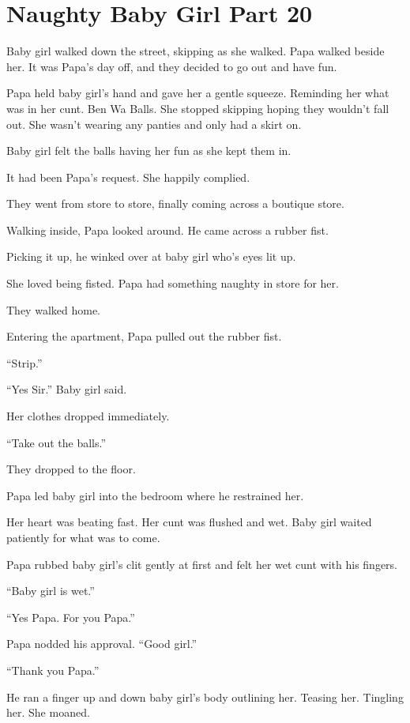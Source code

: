\section{Naughty Baby Girl Part 20}

    Baby girl walked down the street, skipping as she walked. Papa walked beside her. It was Papa’s day off, and they decided to go out and have fun.

    Papa held baby girl’s hand and gave her a gentle squeeze. Reminding her what was in her cunt. Ben Wa Balls. She stopped skipping hoping they wouldn’t fall out. She wasn’t wearing any panties and only had a skirt on.

    Baby girl felt the balls having her fun as she kept them in.

    It had been Papa’s request. She happily complied.

    They went from store to store, finally coming across a boutique store.

    Walking inside, Papa looked around. He came across a rubber fist.

    Picking it up, he winked over at baby girl who’s eyes lit up.

    She loved being fisted. Papa had something naughty in store for her.

    They walked home.

    Entering the apartment, Papa pulled out the rubber fist.

    “Strip.”

    “Yes Sir.” Baby girl said.

    Her clothes dropped immediately.

    “Take out the balls.”

    They dropped to the floor.

    Papa led baby girl into the bedroom where he restrained her.

    Her heart was beating fast. Her cunt was flushed and wet. Baby girl waited patiently for what was to come.

    Papa rubbed baby girl’s clit gently at first and felt her wet cunt with his fingers.

    “Baby girl is wet.”

    “Yes Papa. For you Papa.”

    Papa nodded his approval. “Good girl.”

    “Thank you Papa.”

    He ran a finger up and down baby girl’s body outlining her. Teasing her. Tingling her. She moaned.

